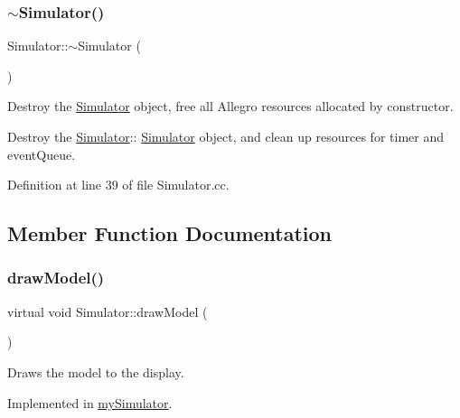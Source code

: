 \subsubsection{\texorpdfstring{$\sim$Simulator()}{~Simulator()}}
{\footnotesize\ttfamily Simulator\+::$\sim$\+Simulator (\begin{DoxyParamCaption}{ }\end{DoxyParamCaption})}



Destroy the \mbox{\hyperlink{class_simulator}{Simulator}} object, free all Allegro resources allocated by constructor. 

Destroy the \mbox{\hyperlink{class_simulator}{Simulator}}\+:\+: \mbox{\hyperlink{class_simulator}{Simulator}} object, and clean up resources for timer and event\+Queue.

Definition at line 39 of file Simulator.\+cc.


\begin{DoxyCode}{0}

\end{DoxyCode}


\subsection{Member Function Documentation}
\mbox{\label{class_simulator_ad47f95a2a5201a46f760c14d63d84725}} 
\subsubsection{\texorpdfstring{drawModel()}{drawModel()}}
{\footnotesize\ttfamily virtual void Simulator\+::draw\+Model (\begin{DoxyParamCaption}{ }\end{DoxyParamCaption})\hspace{0.3cm}{\ttfamily [pure virtual]}}



Draws the model to the display. 



Implemented in \mbox{\hyperlink{classmy_simulator_a6750776d452448e55ab0bfa130e67437}{my\+Simulator}}.

